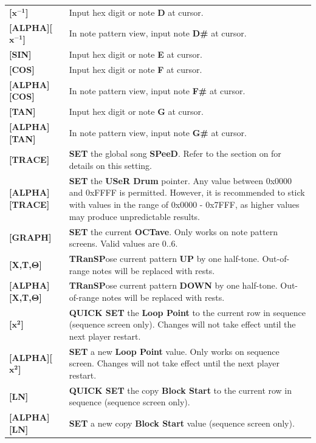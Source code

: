 \documentclass[12pt]{report}	%
\begin{document}
\begin{longtable}{p{} p{} }
\textbf{[$\bm{x^{-1}}$]} & Input hex digit or note \textbf{D} at cursor. \\
\textbf{[ALPHA][$\bm{x^{-1}}$]} & In note pattern view, input note \textbf{D\#} at cursor. \\
\textbf{[SIN]} & Input hex digit or note \textbf{E} at cursor. \\
\textbf{[COS]} & Input hex digit or note \textbf{F} at cursor. \\
\textbf{[ALPHA][COS]} & In note pattern view, input note \textbf{F\#} at cursor. \\
\textbf{[TAN]} & Input hex digit or note \textbf{G} at cursor. \\
\textbf{[ALPHA][TAN]} & In note pattern view, input note \textbf{G\#} at cursor. \\
\hline
\textbf{[TRACE]} & \textbf{SET} the global song \textbf{SPeeD}. Refer to the section on \nameref{sec:globalvars} for details on this setting. \\
\textbf{[ALPHA][TRACE]} & \textbf{SET} the \textbf{USeR Drum} pointer. Any value between 0x0000 and 0xFFFF is permitted. However, it is recommended to stick with values in the range of 0x0000 - 0x7FFF, as higher values may produce unpredictable results. \\
\textbf{[GRAPH]} & \textbf{SET} the current \textbf{OCTave}. Only works on note pattern screens. Valid values are 0..6. \\
\hline
\textbf{[X,T,$\bm{\Theta}$]} & \textbf{TRanSP}ose current pattern \textbf{UP} by one half-tone. Out-of-range notes will be replaced with rests. \\
\textbf{[ALPHA][X,T,$\bm{\Theta}$]} & \textbf{TRanSP}ose current pattern \textbf{DOWN} by one half-tone. Out-of-range notes will be replaced with rests. \\
\hline
\textbf{[$\bm{x^2}$]} & \textbf{QUICK SET} the \textbf{Loop Point} to the current row in sequence (sequence screen only). Changes will not take effect until the next player restart. \\
\textbf{[ALPHA][$\bm{x^2}$]} & \textbf{SET} a new \textbf{Loop Point} value. Only works on sequence screen. Changes will not take effect until the next player restart. \\
\hline
\textbf{[LN]} & \textbf{QUICK SET} the copy \textbf{Block Start} to the current row in sequence (sequence screen only). \\
\textbf{[ALPHA][LN]} & \textbf{SET} a new copy \textbf{Block Start} value (sequence screen only). \\

\end{longtable}
\end{document}
